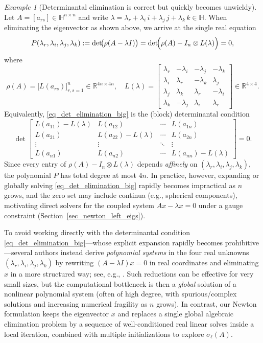 \documentclass[preprint,12pt]{elsarticle}  %
\theoremstyle{definition}
\theoremstyle{definition}
\theoremstyle{definition}
\theoremstyle{definition}
\theoremstyle{definition}
\theoremstyle{remark}
\theoremstyle{remark}
\newtheorem{Ex}{Example}
\theoremstyle{remark}
\DeclareRobustCommand{\i}{\ensuremath{\mathbf{i}}}
\DeclareRobustCommand{\j}{\ensuremath{\mathbf{j}}}
\DeclareRobustCommand{\k}{\ensuremath{\mathbf{k}}}
\def\i{i}\def\j{j}\def\k{k}%
\newcommand{\RR}{\mathbb{R}}
\newcommand{\HH}{\mathbb{H}}
\begin{document}
\begin{Ex}[Determinantal elimination is correct but quickly becomes unwieldy]
\label{ex_det_elimination_awkward}
Let $A=[a_{rs}]\in\HH^{n\times n}$ and write
$\lambda=\lambda_r+\lambda_i\,\i+\lambda_j\,\j+\lambda_k\,\k\in\HH.$
When eliminating the eigenvector as shown above, we arrive at the single real equation
\begin{equation}
\label{eq_det_elimination_big}
P(\lambda_r,\lambda_i,\lambda_j,\lambda_k)
:=\det\!\bigl(\rho(A-\lambda I)\bigr)
=\det\!\Bigl(\rho(A)-I_n\otimes L(\lambda)\Bigr)=0,
\end{equation}
where
\[
\rho(A)=\bigl[L(a_{rs})\bigr]_{r,s=1}^n\in\RR^{4n\times 4n},\quad
L(\lambda)=
\begin{bmatrix}
 \lambda_r & -\lambda_i & -\lambda_j & -\lambda_k\\
 \lambda_i &  \lambda_r & -\lambda_k &  \lambda_j\\
 \lambda_j &  \lambda_k &  \lambda_r & -\lambda_i\\
 \lambda_k & -\lambda_j &  \lambda_i &  \lambda_r
\end{bmatrix}\in\RR^{4\times 4}.
\]
Equivalently, \eqref{eq_det_elimination_big} is the (block) determinantal condition
\[
\det\!\begin{bmatrix}
L(a_{11})-L(\lambda) & L(a_{12})          & \cdots & L(a_{1n})\\
L(a_{21})            & L(a_{22})-L(\lambda)& \cdots & L(a_{2n})\\
\vdots               & \vdots             & \ddots & \vdots\\
L(a_{n1})            & L(a_{n2})           & \cdots & L(a_{nn})-L(\lambda)
\end{bmatrix}=0.
\]
Since every entry of $\rho(A)-I_n\otimes L(\lambda)$ depends \emph{affinely} on
$(\lambda_r,\lambda_i,\lambda_j,\lambda_k)$, the polynomial $P$ has total degree at most $4n$.
In practice, however, expanding or globally solving \eqref{eq_det_elimination_big} rapidly becomes impractical as $n$ grows,
and the zero set may include continua (e.g., spherical components), motivating direct solvers for the coupled system $Ax-\lambda x=0$ under a gauge constraint (Section~\ref{sec_newton_left_eigs}).
\end{Ex}
%
To avoid working directly with the determinantal condition \eqref{eq_det_elimination_big}---whose explicit expansion
rapidly becomes prohibitive---several authors instead derive \emph{polynomial systems} in the four real unknowns
$(\lambda_r,\lambda_i,\lambda_j,\lambda_k)$ by rewriting $(A-\lambda I)x=0$ in real coordinates and eliminating $x$ in a more structured way; see, e.g., \cite{MaciasVirgosPereiraSaez2014,LiuKou2019}. Such reductions can be effective
for very small sizes, but the computational bottleneck is then a \emph{global} solution of a nonlinear polynomial system (often of high degree, with spurious/complex solutions and increasing numerical fragility as $n$ grows).
In contrast, our Newton formulation keeps the eigenvector $x$ and replaces a single global algebraic elimination problem by a sequence of well-conditioned real linear solves inside a local iteration, combined with multiple initializations to explore $\sigma_\ell(A)$.
\end{document}
